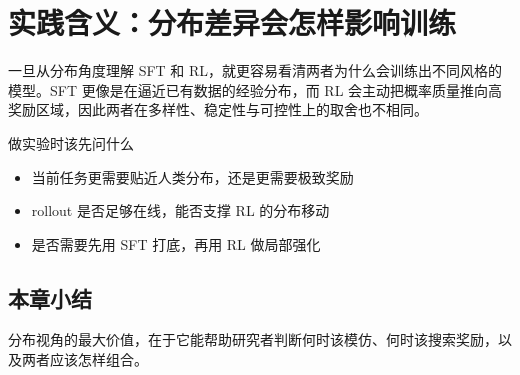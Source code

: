 \section{实践含义：分布差异会怎样影响训练}
一旦从分布角度理解 SFT 和 RL，就更容易看清两者为什么会训练出不同风格的模型。SFT 更像是在逼近已有数据的经验分布，而 RL 会主动把概率质量推向高奖励区域，因此两者在多样性、稳定性与可控性上的取舍也不相同。

\begin{knowledgebox}{做实验时该先问什么}
\begin{itemize}
  \item 当前任务更需要贴近人类分布，还是更需要极致奖励
  \item rollout 是否足够在线，能否支撑 RL 的分布移动
  \item 是否需要先用 SFT 打底，再用 RL 做局部强化
\end{itemize}
\end{knowledgebox}

\subsection{本章小结}
分布视角的最大价值，在于它能帮助研究者判断何时该模仿、何时该搜索奖励，以及两者应该怎样组合。

\newpage
